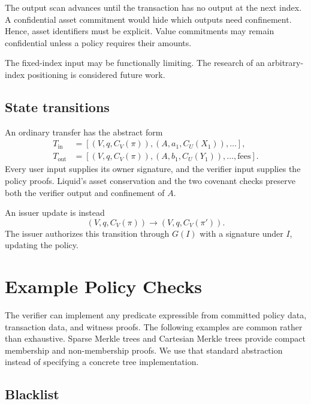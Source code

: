 \documentclass[11pt]{article}
\begin{document}
    The output scan advances until the transaction has no output at the next index.
    A confidential asset commitment would hide which outputs need confinement. Hence, asset identifiers must be explicit.
    Value commitments may remain confidential unless a policy requires their amounts.

    The fixed-index input may be functionally limiting.
    The research of an arbitrary-index positioning is considered future work.

    \subsection{State transitions}

    An ordinary transfer has the abstract form
    \begin{align}
        T_{\mathrm{in}} &=[(V,q,C_V(\pi)),(A,a_1,C_U(X_1)),\ldots], \\
        T_{\mathrm{out}}&=[(V,q,C_V(\pi)),(A,b_1,C_U(Y_1)),\ldots,\mathrm{fees}].
    \end{align}
    Every user input supplies its owner signature, and the verifier input supplies the policy proofs.
    Liquid's asset conservation and the two covenant checks preserve both the verifier output and confinement of $A$.

    An issuer update is instead
    \begin{equation}
        (V,q,C_V(\pi))\longrightarrow(V,q,C_V(\pi')).
    \end{equation}
    The issuer authorizes this transition through $G(I)$ with a signature under $I$, updating the policy.


    \section{Example Policy Checks}
    \label{sec:policies}

    The verifier can implement any predicate expressible from committed policy data, transaction data, and witness proofs.
    The following examples are common rather than exhaustive.
    Sparse Merkle trees \cite{compact-smt} and Cartesian Merkle trees \cite{cmt} provide compact membership and non-membership proofs.
    We use that standard abstraction instead of specifying a concrete tree implementation.

    \subsection{Blacklist}
\end{document}
